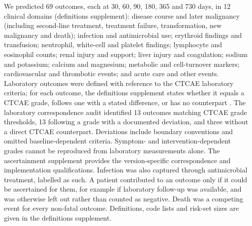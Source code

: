 We predicted 69 outcomes, each at 30, 60, 90, 180, 365 and 730 days, in 12
clinical domains (definitions supplement): disease course and later malignancy
(including second-line treatment, treatment failure, transformation, new
malignancy and death); infection and antimicrobial use; erythroid findings and
transfusion; neutrophil, white-cell and platelet findings; lymphocyte and
eosinophil counts; renal injury and support; liver injury and coagulation;
sodium and potassium; calcium and magnesium; metabolic and cell-turnover
markers; cardiovascular and thrombotic events; and acute care and other events.
Laboratory outcomes were defined with reference to the CTCAE laboratory
criteria; for each outcome, the definitions supplement states whether it equals a
CTCAE grade, follows one with a stated difference, or has no counterpart
\citep{nci2017ctcae}.
The laboratory correspondence audit identified 13 outcomes matching CTCAE grade
thresholds, 13 following a grade with a documented deviation, and three without
a direct CTCAE counterpart. Deviations include boundary conventions and omitted
baseline-dependent criteria. Symptom- and intervention-dependent grades cannot
be reproduced from laboratory measurements alone. The ascertainment supplement
provides the version-specific correspondence and implementation qualifications.
Infection was also captured through antimicrobial treatment, labelled as such.
A patient contributed to an outcome only if it could be ascertained for them,
for example if laboratory follow-up was available, and was otherwise left out
rather than counted as negative. Death was a competing event for every non-fatal
outcome. Definitions, code lists and risk-set sizes are given in the
definitions supplement.

